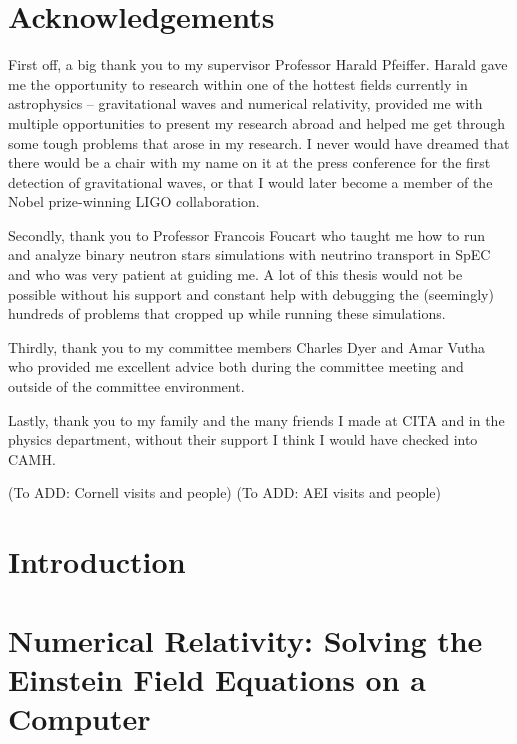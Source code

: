 \documentclass{ut-thesis}
\begin{document}



\section{Acknowledgements}

First off, a big thank you to my supervisor Professor Harald Pfeiffer. Harald gave me the opportunity to research within one of the hottest fields currently in astrophysics -- gravitational waves and numerical relativity, provided me with multiple opportunities to present my research abroad and helped me get through some tough problems that arose in my research. I never would have dreamed that there would be a chair with my name on it at the press conference for the first detection of gravitational waves, or that I would later become a member of the Nobel prize-winning LIGO collaboration. 

Secondly, thank you to Professor Francois Foucart who taught me how to run and analyze binary neutron stars simulations with neutrino transport in SpEC and who was very patient at guiding me. A lot of this thesis would not be possible without his support and constant help with debugging the (seemingly) hundreds of problems that cropped up while running these simulations.

Thirdly, thank you to my committee members Charles Dyer and Amar Vutha who provided me excellent advice both during the committee meeting and outside of the committee environment.

Lastly, thank you to my family and the many friends I made at CITA and in the physics department, without their support I think I would have checked into CAMH.

(To ADD: Cornell visits and people) 
(To ADD: AEI visits and people)

\section{Introduction}

\section{Numerical Relativity: Solving the Einstein Field Equations on a Computer}


\end{document}
